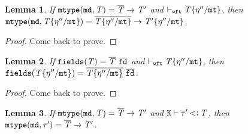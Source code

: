 \documentclass[onecolumn,nocopyrightspace]{sigplanconf}
\newtheorem{lemma}{Lemma}
\theoremstyle{lessintrusive}
\theoremstyle{plain}
\theoremstyle{custom}
\begin{document}
\begin{lemma}
\label{pf:fmtype-substitutes}
If $\mathtt{mtype}(\mathtt{md},\mathit{T}) = \overline{\mathit{T}}\rightarrow\mathit{T}'$ and $\vdash_{\tt wft}\mathit{T}\{\eta''/\mathtt{mt}\}$, then $\mathtt{mtype}(\mathtt{md},\mathit{T}\{\eta''/\mathtt{mt}\}) = \overline{\mathit{T}\{\eta''/\mathtt{mt}\}}\rightarrow\mathit{T}'\{\eta''/\mathtt{mt}\}$. 
\end{lemma} 

\begin{proof}
Come back to prove.
\end{proof}

\begin{lemma}
\label{pf:ffields-substitutes}
If $\Ffields(\bt) = \overline{\bt}\ \overline{\Fname}$ and $\vdash_{\tt wft}\mathit{T}\{\eta''/\mathtt{mt}\}$, then $\Ffields(\bt\subst{\mtvar}{\basemode''}) = \overline{\bt\subst{\mtvar}{\basemode''}}\ \overline{\Fname}$.
\end{lemma} 

\begin{proof}
Come back to prove.
\end{proof}


\begin{lemma}
\label{pf:fmtype-subtypes}
If $\mathtt{mtype}(\mathtt{md},\mathit{T}) = \overline{\mathit{T}}\rightarrow\mathit{T}'$ and $\mathtt{K}\vdash\tau'\mathbin{<\vcentcolon}\mathit{T}$, then $\mathtt{mtype}(\mathtt{md},\tau') = \overline{\mathit{T}}\rightarrow\mathit{T}'$. 
\end{lemma}
\end{document}
